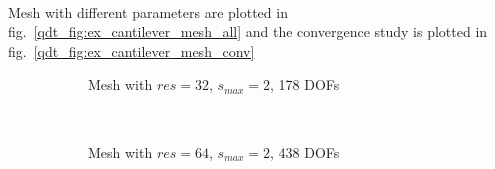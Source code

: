 \paragraph{}
Mesh with different parameters are plotted in fig.~\ref{qdt_fig:ex_cantilever_mesh_all} and the convergence study is plotted in fig.~\ref{qdt_fig:ex_cantilever_mesh_conv}

    \begin{figure}[!ht]
        \begin{subfigure}[b]{1\linewidth}
            \centering
            \caption{Mesh with $res=32$, $s_{max}=2$, 178 DOFs}
        \end{subfigure}
        \\
        \begin{subfigure}[b]{1\linewidth}
            \centering
            \caption{Mesh with $res=64$, $s_{max}=2$, 438 DOFs}
        \end{subfigure}
        \\
        \begin{subfigure}[b]{1\linewidth}

\end{subfigure}
\end{figure}
